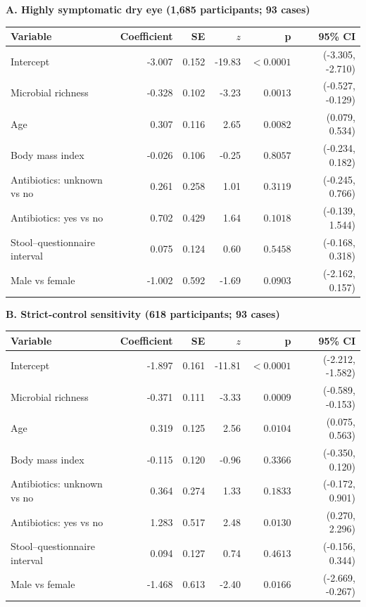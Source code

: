 \textbf{A. Highly symptomatic dry eye (1,685 participants; 93 cases)}
\par\smallskip
\begin{tabular}{p{5.5cm}rrrrr}
\toprule
Variable & Coefficient & SE & $z$ & p & 95\% CI \\
\midrule
Intercept & -3.007 & 0.152 & -19.83 & $<0.0001$ & (-3.305, -2.710) \\
Microbial richness & -0.328 & 0.102 & -3.23 & $0.0013$ & (-0.527, -0.129) \\
Age & 0.307 & 0.116 & 2.65 & $0.0082$ & (0.079, 0.534) \\
Body mass index & -0.026 & 0.106 & -0.25 & $0.8057$ & (-0.234, 0.182) \\
Antibiotics: unknown vs no & 0.261 & 0.258 & 1.01 & $0.3119$ & (-0.245, 0.766) \\
Antibiotics: yes vs no & 0.702 & 0.429 & 1.64 & $0.1018$ & (-0.139, 1.544) \\
Stool--questionnaire interval & 0.075 & 0.124 & 0.60 & $0.5458$ & (-0.168, 0.318) \\
Male vs female & -1.002 & 0.592 & -1.69 & $0.0903$ & (-2.162, 0.157) \\
\bottomrule
\end{tabular}
\par\medskip
\textbf{B. Strict-control sensitivity (618 participants; 93 cases)}
\par\smallskip
\begin{tabular}{p{5.5cm}rrrrr}
\toprule
Variable & Coefficient & SE & $z$ & p & 95\% CI \\
\midrule
Intercept & -1.897 & 0.161 & -11.81 & $<0.0001$ & (-2.212, -1.582) \\
Microbial richness & -0.371 & 0.111 & -3.33 & $0.0009$ & (-0.589, -0.153) \\
Age & 0.319 & 0.125 & 2.56 & $0.0104$ & (0.075, 0.563) \\
Body mass index & -0.115 & 0.120 & -0.96 & $0.3366$ & (-0.350, 0.120) \\
Antibiotics: unknown vs no & 0.364 & 0.274 & 1.33 & $0.1833$ & (-0.172, 0.901) \\
Antibiotics: yes vs no & 1.283 & 0.517 & 2.48 & $0.0130$ & (0.270, 2.296) \\
Stool--questionnaire interval & 0.094 & 0.127 & 0.74 & $0.4613$ & (-0.156, 0.344) \\
Male vs female & -1.468 & 0.613 & -2.40 & $0.0166$ & (-2.669, -0.267) \\
\bottomrule
\end{tabular}
